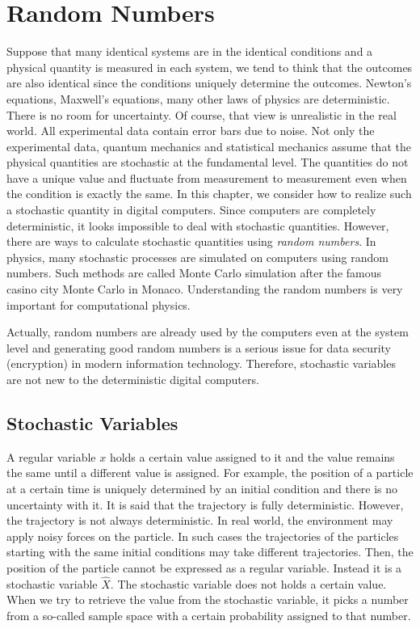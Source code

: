\chapter{Random Numbers}\label{ch:random-numbers}


Suppose that many identical systems are in the identical conditions and a physical quantity is measured in each system, we tend to think that the outcomes are also identical since the conditions uniquely determine the outcomes.  Newton's equations, Maxwell's equations, many other laws of physics are deterministic.  There is no room for uncertainty. Of course, that view is unrealistic in the real world.  All experimental data contain error bars due to noise. Not only the experimental data, quantum mechanics and statistical mechanics assume that the physical quantities are stochastic at the fundamental level.  The quantities do not have a unique value and fluctuate from measurement to measurement even when the condition is exactly the same.  In this chapter, we consider how to realize such a stochastic quantity in digital computers.  Since computers are completely deterministic, it looks impossible to deal with stochastic quantities.  However, there are ways to calculate stochastic quantities using \textit{random numbers}. 
In physics,  many stochastic processes are simulated on computers using random numbers.  Such methods are called Monte Carlo simulation after the famous casino city Monte Carlo in Monaco.  Understanding the random numbers is very important for computational physics.

Actually, random numbers are already used by the computers even at the system level and generating good random numbers is a serious issue for data security (encryption) in modern information technology.  Therefore, stochastic variables are not new to the deterministic digital computers.

\noindent
\section{Stochastic Variables}

A regular variable $x$ holds a certain value assigned to it and the value remains the same until a different value is assigned.  For example, the position of a particle at a certain time is uniquely determined by an initial condition and there is no uncertainty with it.  It is said that the trajectory is fully deterministic.  However, the trajectory is not always deterministic.  In real world, the environment may apply noisy forces on the particle.  In such cases the trajectories of the particles starting with the same initial conditions may take different trajectories. Then, the position of the particle cannot be expressed as a regular variable.  Instead it is a stochastic variable $\hat{X}$.  The stochastic variable does not holds a certain value.  When we try to retrieve the value from the stochastic variable, it picks a number from a so-called sample space with a certain probability assigned to that number.


